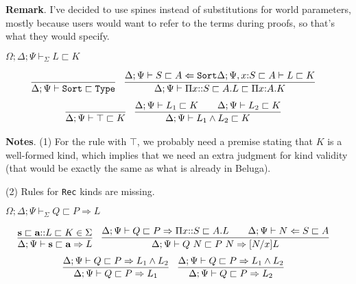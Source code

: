 \documentclass[letterpaper, 11pt]{article}
\newcommand{\Rar}{\Rightarrow}
\newcommand{\Lar}{\Leftarrow}
\newcommand{\Type}{\texttt{Type}}
\newcommand{\Sort}{\texttt{Sort}}
\begin{document}
    \textbf{Remark}.  I've decided to use spines instead of substitutions for world parameters, mostly because users would want to refer to
    the terms during proofs, so that's what they would specify.

    $\boxed{\Omega; \Delta; \Psi \vdash_\Sigma L \sqsubset K}$
    
    \begin{align*}
      & \infer{\Delta ; \Psi \vdash \Sort \sqsubset \Type}{} &
      & \infer{\Delta ; \Psi \vdash \Pi x{::}S \sqsubset A.L \sqsubset \Pi x{:}A.K}
        {
          \Delta ; \Psi \vdash S \sqsubset A \Lar \Sort
          \Delta ; \Psi, x {:} S \sqsubset A \vdash L \sqsubset K
        }
    \end{align*}
    \begin{align*}
      & \infer{\Delta ; \Psi \vdash \top \sqsubset K}{} &
      & \infer{\Delta ; \Psi \vdash L_1 \land L_2 \sqsubset K}
        {
          \Delta ; \Psi  \vdash L_1 \sqsubset K
          &&
          \Delta ; \Psi  \vdash L_2 \sqsubset K
        }
    \end{align*}

    \textbf{Notes}. (1) For the rule with $\top$, we probably need a premise stating that $K$ is a well-formed kind, which implies that we need an extra
    judgment for kind validity (that would be exactly the same as what is already in Beluga).

    (2) Rules for \texttt{Rec} kinds are missing.

    $\boxed{\Omega; \Delta; \Psi \vdash_\Sigma Q \sqsubset P \Rar L}$

    \begin{align*}
      & \infer{\Delta ; \Psi \vdash \textbf{s} \sqsubset \textbf{a} \Rar L}
        {
          \textbf{s} \sqsubset \textbf{a} {::} L \sqsubset K \in \Sigma
        } &
      & \infer{\Delta; \Psi \vdash Q \ N \sqsubset P \ N \Rar [N/x]L}
        {
          \Delta ; \Psi \vdash Q \sqsubset P \Rar \Pi x{::}S \sqsubset A. L
          &&
          \Delta ; \Psi \vdash N \Lar S \sqsubset A
        }
    \end{align*}
    \begin{align*}
      & \infer{\Delta ; \Psi \vdash Q \sqsubset P \Rar L_1}
        {
          \Delta ; \Psi \vdash Q \sqsubset P \Rar L_1 \land L_2
        } &
      & \infer{\Delta ; \Psi \vdash Q \sqsubset P \Rar L_2}
        {
          \Delta ; \Psi \vdash Q \sqsubset P \Rar L_1 \land L_2
        }
    \end{align*}
\end{document}
